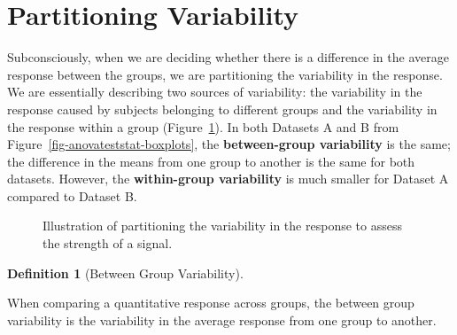 \documentclass[
  letterpaper,
  DIV=11,
  numbers=noendperiod]{scrreprt}
\theoremstyle{plain}
\theoremstyle{definition}
\theoremstyle{definition}
\newtheorem{definition}{Definition}[chapter]
\theoremstyle{remark}
\begin{document}
\section{Partitioning Variability}\label{partitioning-variability-1}

Subconsciously, when we are deciding whether there is a difference in
the average response between the groups, we are partitioning the
variability in the response. We are essentially describing two sources
of variability: the variability in the response caused by subjects
belonging to different groups and the variability in the response within
a group (Figure~\ref{fig-anovateststat-partition-variability}). In both
Datasets A and B from Figure~\ref{fig-anovateststat-boxplots}, the
\textbf{between-group variability} is the same; the difference in the
means from one group to another is the same for both datasets. However,
the \textbf{within-group variability} is much smaller for Dataset A
compared to Dataset B.

\begin{figure}


\caption{\label{fig-anovateststat-partition-variability}Illustration of
partitioning the variability in the response to assess the strength of a
signal.}

\end{figure}%

\begin{definition}[Between Group
Variability]\protect\hypertarget{def-between-group-variability}{}\label{def-between-group-variability}

When comparing a quantitative response across groups, the between group
variability is the variability in the average response from one group to
another.

\end{definition}
\end{document}
